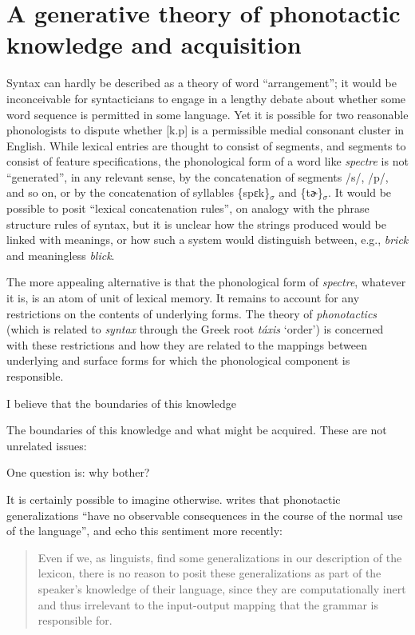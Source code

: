 \chapter{A generative theory of phonotactic knowledge and acquisition}
\label{intro}

Syntax can hardly be described as a theory of word ``arrangement''; it would be inconceivable for syntacticians to engage in a lengthy debate about whether some word sequence is permitted in some language. Yet it is possible for two reasonable phonologists to dispute whether [k.p] is a permissible medial consonant cluster in English. While lexical entries are thought to consist of segments, and segments to consist of feature specifications, the phonological form of a word like \emph{spectre} is not ``generated'', in any relevant sense, by the concatenation of segments /s/, /p/, and so on, or by the concatenation of syllables \{spɛk\}$_{\sigma}$ and \{tɚ\}$_{\sigma}$. It would be possible to posit ``lexical concatenation rules'', on analogy with the phrase structure rules of syntax, but it is unclear how the strings produced would be linked with meanings, or how such a system would distinguish between, e.g., \emph{brick} and meaningless \emph{blick}.

The more appealing alternative is that the phonological form of \emph{spectre}, whatever it is, is an atom of unit of lexical memory. It remains to account for any restrictions on the contents of underlying forms. The theory of \emph{phonotactics} (which is related to \emph{syntax} through the Greek root \emph{táxis} `order') is concerned with these restrictions and how they are related to the mappings between underlying and surface forms for which the phonological component is responsible. 


I believe that the boundaries of this knowledge

The boundaries of this knowledge
and what might be acquired.
These are not unrelated issues:

One question is: why bother?

It is certainly possible to imagine otherwise. \citet[][320]{Zimmer1969} writes that phonotactic generalizations ``have no observable consequences in the course of the normal use of the language'', and \citeauthor{PE} echo this sentiment more recently:

\begin{quote}
Even if we, as linguists, find some generalizations in our description of the lexicon, there is no reason to posit these generalizations as part of the speaker's knowledge of their language, since they are computationally inert and thus irrelevant to the input-output mapping that the grammar is responsible for. \citep[][18]{PE}
\end{quote}

